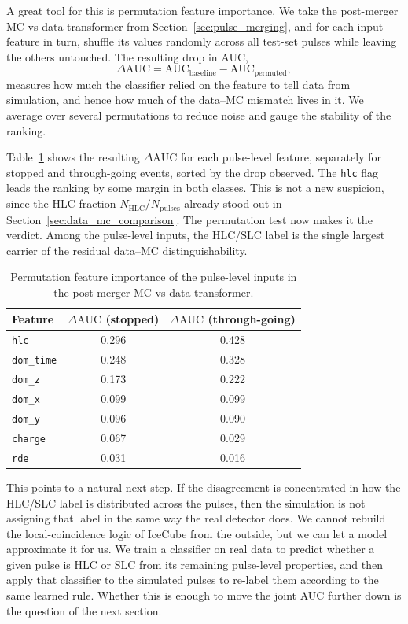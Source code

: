 A great tool for this is permutation feature importance. We take the post-merger MC-vs-data transformer from Section~\ref{sec:pulse_merging}, and for each input feature in turn, shuffle its values randomly across all test-set pulses while leaving the others untouched. The resulting drop in AUC,
\[
    \Delta \mathrm{AUC}
    =
    \mathrm{AUC}_{\mathrm{baseline}}
    -
    \mathrm{AUC}_{\mathrm{permuted}},
\]
measures how much the classifier relied on the feature to tell data from simulation, and hence how much of the data--MC mismatch lives in it. We average over several permutations to reduce noise and gauge the stability of the ranking.

Table~\ref{tab:perm_importance_pulse} shows the resulting $\Delta\mathrm{AUC}$ for each pulse-level feature, separately for stopped and through-going events, sorted by the drop observed. The \texttt{hlc} flag leads the ranking by some margin in both classes. This is not a new suspicion, since the HLC fraction $N_{\mathrm{HLC}}/N_{\mathrm{pulses}}$ already stood out in Section~\ref{sec:data_mc_comparison}. The permutation test now makes it the verdict. Among the pulse-level inputs, the HLC/SLC label is the single largest carrier of the residual data--MC distinguishability.

\begin{table}[H]
\centering
\begin{tabular}{lcc}
\toprule
Feature & $\Delta\mathrm{AUC}$ (stopped) & $\Delta\mathrm{AUC}$ (through-going) \\
\midrule
\texttt{hlc}      & 0.296 & 0.428 \\
\texttt{dom\_time} & 0.248 & 0.328 \\
\texttt{dom\_z}    & 0.173 & 0.222 \\
\texttt{dom\_x}    & 0.099 & 0.099 \\
\texttt{dom\_y}    & 0.096 & 0.090 \\
\texttt{charge}    & 0.067 & 0.029 \\
\texttt{rde}       & 0.031 & 0.016 \\
\bottomrule
\end{tabular}
\caption{Permutation feature importance of the pulse-level inputs in the post-merger MC-vs-data transformer.}
\label{tab:perm_importance_pulse}
\end{table}



This points to a natural next step. If the disagreement is concentrated in how the HLC/SLC label is distributed across the pulses, then the simulation is not assigning that label in the same way the real detector does. We cannot rebuild the local-coincidence logic of IceCube from the outside, but we can let a model approximate it for us. We train a classifier on real data to predict whether a given pulse is HLC or SLC from its remaining pulse-level properties, and then apply that classifier to the simulated pulses to re-label them according to the same learned rule. Whether this is enough to move the joint AUC further down is the question of the next section.

